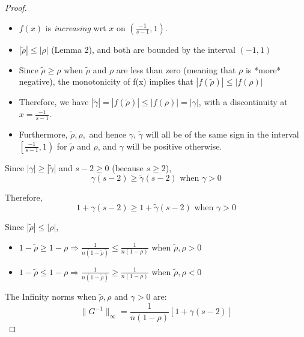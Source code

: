\begin{proof}
{
	\small
	\begin{itemize}
		\item $f(x)$ is \textit{increasing} wrt $ x $ on $\left(\frac{-1}{s-1}, 1\right)$.
		\item $|\tilde{\rho}| \leq |\rho|$ (Lemma 2), and both are bounded by the interval $(-1,1)$
		\item Since $ \tilde{\rho} \geq \rho $ when $ \tilde{\rho} $ and $ \rho $ are less than zero (meaning that $ \rho $ is *more* negative), the monotonicity of f(x) implies that $ |f(\tilde{\rho})| \leq |f(\rho)| $
		\item Therefore, we have $|\tilde{\gamma}| = |f(\tilde{\rho})| \leq |f(\rho)| = |\gamma|$, with a discontinuity at $ x = \frac{-1}{s-1} $.
		\item Furthermore, $ \tilde{\rho}, \rho, $ and hence $ \gamma $, $ \tilde{\gamma} $ will all be of the same sign in the interval $ \left[\frac{-1}{s-1}, 1 \right) $ for $ \tilde{\rho} $ and $ \rho $, and $ \gamma $ will be positive otherwise.
	\end{itemize}
}

Since $|\gamma| \geq |\tilde{\gamma}|$ and $s - 2 \geq 0$ (because $s \geq 2$),
\begin{equation}\label{eq:app-lemma4-gamma-order}
\gamma (s - 2) \geq \tilde{\gamma} (s - 2) \text{ when } \gamma > 0
\end{equation}

Therefore,
\begin{equation}\label{eq:app-lemma4-row-sum-order}
1 + \gamma (s - 2) \geq 1 + \tilde{\gamma} (s - 2) \text{ when } \gamma > 0
\end{equation}

Since $ |\tilde{\rho}| \leq |\rho| $,
\begin{itemize}
	\item $ 1 - \tilde{\rho} \geq 1 - \rho \Rightarrow \frac{1}{n (1 - \tilde{\rho})} \leq \frac{1}{n (1 - \rho)} $ when $ \tilde{\rho}, \rho > 0 $
	\item $ 1 - \tilde{\rho} \leq 1 - \rho \Rightarrow \frac{1}{n (1 - \tilde{\rho})} \geq \frac{1}{n (1 - \rho)} $ when $ \tilde{\rho}, \rho < 0 $
\end{itemize}

The Infinity norms when $ \tilde{\rho}, \rho $ and $ \gamma > 0 $ are:
\begin{equation}\label{eq:app-lemma4-raw-inverse-norm}
\|G^{-1}\|_\infty = \frac{1}{n (1 - \rho)} \left[ 1 + \gamma (s - 2) \right]
\end{equation}


\end{proof}
